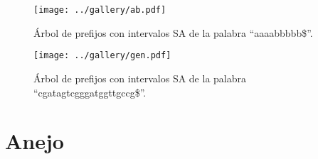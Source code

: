 \documentclass{article}
\newcommand{\C}{C }
\newcommand{\R}{R }
\newcommand{\python}{Python }
\begin{document}
\clearpage
\phantom{}
\vfill
\begin{figure}[h!]
\centering
\texttt{[image: ../gallery/ab.pdf]}
\caption{Árbol de prefijos con intervalos SA de la palabra ``aaaabbbbb\$''.}
\label{fig:arbol2}
\end{figure}
\vfill

\clearpage

\begin{figure}[h]
\centering
\texttt{[image: ../gallery/gen.pdf]}
\caption{Árbol de prefijos con intervalos SA de la palabra ``cgatagtcgggatggttgccg\$''.}
\label{fig:arbol4}
\end{figure}
\clearpage
\section{Anejo}








\vfill



\end{document}
